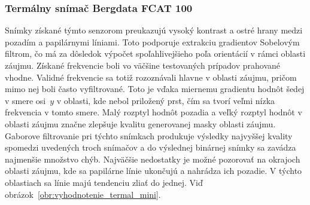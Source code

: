   \subsubsection{Termálny snímač Bergdata FCAT 100}
  Snímky získané týmto senzorom preukazujú vysoký kontrast a ostré hrany medzi pozadím a papilárnymi líniami. Toto podporuje extrakciu gradientov Sobelovým
  filtrom, čo má za dôsledok výpočet spoľahlivejšieho poľa orientácií v rámci oblasti záujmu. Získané frekvencie boli vo väčšine testovaných prípadov
  prahované vhodne. Validné frekvencie sa totiž rozoznávali hlavne v oblasti záujmu, pričom mimo nej boli často vyfiltrované. Toto je vďaka miernemu gradientu
  hodnôt šedej v smere osi~{$y$} v oblasti, kde nebol priložený prst, čím sa tvorí veľmi nízka frekvencia v tomto smere.
  Malý rozptyl hodnôt pozadia a veľký rozptyl hodnôt v oblasti záujmu značne zlepšuje kvalitu generovanej masky oblasti záujmu.
  Gaborove filtrovanie pri týchto snímkach produkuje výsledky najvyššej kvality spomedzi uvedených troch snímačov a do výslednej binárnej snímky sa zavádza
  najmenšie množstvo chýb. Najväčšie nedostatky je možné pozorovať na okrajoch
  oblasti záujmu, kde sa papilárne línie ukončujú a nahrádza ich pozadie. V týchto oblastiach sa línie majú tendenciu zliať do jednej.
  Viď obrázok~{\ref{obr:vyhodnotenie_termal_mini}}.
